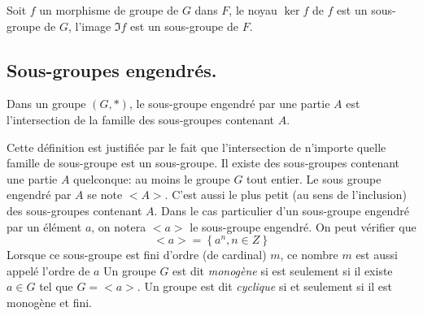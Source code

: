 \begin{prop}
Soit $f$ un morphisme de groupe de $G$ dans $F$, le noyau $\ker f$ de $f$ est un sous-groupe de $G$, l'image $\Im f$ est un sous-groupe de $F$. 
\end{prop}

\subsection{Sous-groupes engendrés.}
\begin{defi}
  Dans un groupe $(G,*)$, le sous-groupe engendré par une partie $A$ est l'intersection de la famille  des sous-groupes contenant $A$.
\end{defi}
Cette définition est justifiée par le fait que l'intersection de n'importe quelle famille de sous-groupe est un sous-groupe. Il existe des sous-groupes contenant une partie $A$ quelconque: au moins le groupe $G$ tout entier. Le sous groupe engendré par $A$ se note $<A>$. C'est aussi le plus petit (au sens de l'inclusion) des sous-groupes contenant $A$.
Dans le cas particulier d'un sous-groupe engendré par un élément $a$, on notera $<a>$ le sous-groupe engendré. On peut vérifier que 
\begin{displaymath}
  <a> = \left\lbrace a^n, n\in Z \right\rbrace 
\end{displaymath}
Lorsque ce sous-groupe est fini d'ordre (de cardinal) $m$, ce nombre $m$ est aussi appelé l'ordre de $a$ 
Un groupe $G$ est dit \emph{monogène} si est seulement si il existe $a\in G$ tel que $G=<a>$.
 Un groupe est dit \emph{cyclique} si et seulement si il est monogène et fini.

